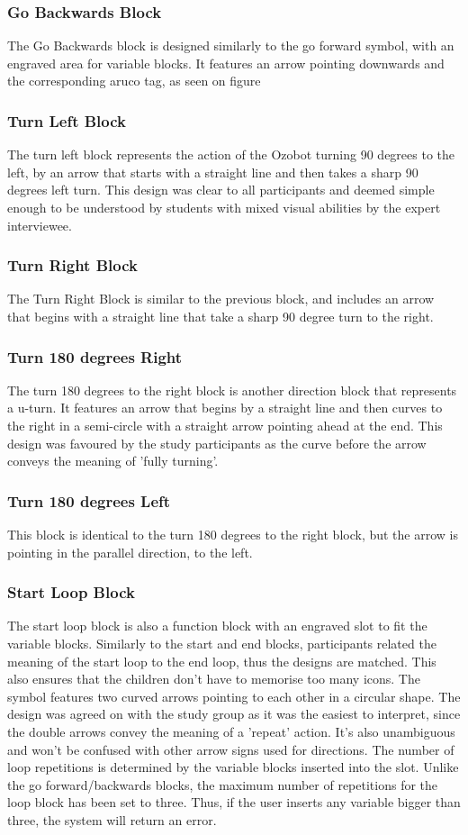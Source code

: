 \documentclass[oneside,%
                    author={Malak Hajji},
                    degree={BSc},
                    title={Designing An Accessible Computational Toolkit For Students},
                  subtitle={With Mixed Visual Abilities}]{dissertation}
\begin{document}
\subsubsection{Go Backwards Block}
The Go Backwards block is designed similarly to the go forward symbol, with an engraved area for variable blocks. It features an arrow pointing downwards and the corresponding aruco tag, as seen on figure 
\subsubsection{Turn Left Block}
The turn left block represents the action of the Ozobot turning 90 degrees to the left, by an arrow that starts with a straight line and then takes a sharp 90 degrees left turn. This design was clear to all participants and deemed simple enough to be understood by students with mixed visual abilities by the expert interviewee.
\subsubsection{Turn Right Block}
The Turn Right Block is similar to the previous block, and includes an arrow that begins with a straight line that take a sharp 90 degree turn to the right.
\subsubsection{Turn 180 degrees Right}
The turn 180 degrees to the right block is another direction block that represents a u-turn. It features an arrow that begins by a straight line and then curves to the right in a semi-circle with a straight arrow pointing ahead at the end. This design was favoured by the study  participants as the curve before the arrow conveys the meaning of 'fully turning'. 
\subsubsection{Turn 180 degrees Left}
This block is identical to the turn 180 degrees to the right block, but the arrow is pointing in the parallel direction, to the left.
\subsubsection{Start Loop Block}
The start loop block is also a function block with an engraved slot to fit the variable blocks. Similarly to the start and end blocks, participants related the meaning of the start loop to the end loop, thus the designs are matched. This also ensures that the children don't have to memorise too many icons. The symbol features two curved arrows pointing to each other in a circular shape. The design was agreed on with the study group as it was the easiest to interpret, since the double arrows convey the meaning of a 'repeat' action. It's also unambiguous and won't be confused with other arrow signs used for directions. The number of loop repetitions is determined by the variable blocks inserted into the slot. Unlike the go forward/backwards blocks, the maximum number of repetitions for the loop block has been set to three. Thus, if the user inserts any variable bigger than three, the system will return an error.
\end{document}
